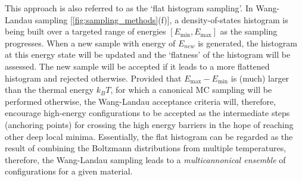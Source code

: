 This approach is also referred to as the `flat histogram sampling'. In Wang-Landau sampling [\cref{fig:sampling_methods}(f)],\cite{wang2001efficient,wang2001determining} a density-of-states histogram is being built over a targeted range of energies $[E_{\min},E_{\max} ]$ as the sampling progresses. When a new sample with energy of $E_{new}$ is generated, the histogram at this energy state will be updated and the `flatness' of the histogram will be assessed. The new sample will be accepted if it leads to a more flattened histogram and rejected otherwise. Provided that $E_{\max}  - E_{\min}$ is (much) larger than the thermal energy $k_B T$, for which a canonical MC sampling will be performed otherwise, the Wang-Landau acceptance criteria will, therefore, encourage high-energy configurations to be accepted as the intermediate steps (anchoring points) for crossing the high energy barriers in the hope of reaching other deep local minima. Essentially, the flat histogram can be regarded as the result of combining the Boltzmann distributions from multiple temperatures, therefore, the Wang-Landau sampling leads to a \textit{multicannonical ensemble} of configurations for a given material.